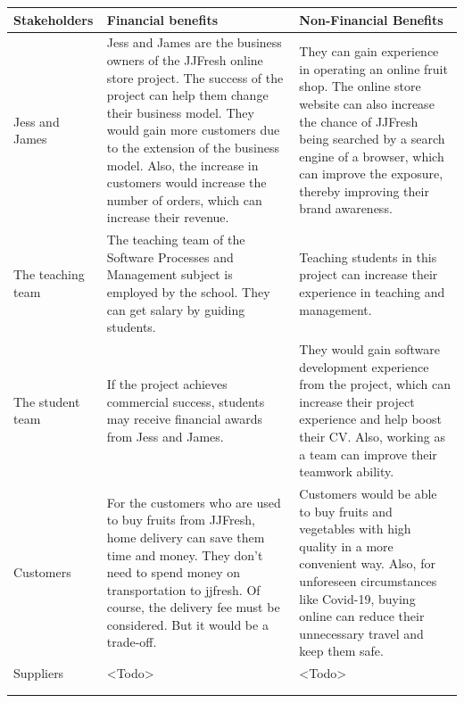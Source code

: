 \documentclass{report}
\begin{document}
\begin{tabularx}{0.95\linewidth}{%
  >{\raggedright\arraybackslash}l%
  >{\raggedright\arraybackslash}X%
  >{\raggedright\arraybackslash}X}
  \toprule
  Stakeholders & Financial benefits & Non-Financial Benefits \\
  \midrule
  Jess and James
  & Jess and James are the business owners of the JJFresh online store project. The success of the project can help them change their business model. They would gain more customers due to the extension of the business model. Also, the increase in customers would increase the number of orders, which can increase their revenue.
  & They can gain experience in operating an online fruit shop. The online store website can also increase the chance of JJFresh being searched by a search engine of a browser, which can improve the exposure, thereby improving their brand awareness. 
  \\
  \midrule
  The teaching team
  & The teaching team of the Software Processes and Management subject is employed by the school. They can get salary by guiding students.
  & Teaching students in this project can increase their experience in teaching and management.
  \\
  \midrule
  The student team
  & If the project achieves commercial success, students may receive financial awards from Jess and James.
  & They would gain software development experience from the project, which can increase their project experience and help boost their CV. Also, working as a team can improve their teamwork ability.
  \\
  \midrule
  Customers
  & For the customers who are used to buy fruits from JJFresh, home delivery can save them time and money. They don't need to spend money on transportation to jjfresh. Of course, the delivery fee must be considered. But it would be a trade-off.
  & Customers would be able to buy fruits and vegetables with high quality in a more convenient way. Also, for unforeseen circumstances like Covid-19, buying online can reduce their unnecessary travel and keep them safe.
  \\
  \midrule
  Suppliers
  & <Todo>
  & <Todo>
  \\
  \bottomrule
  \\
  \caption{Business Value}  
  \label{tab:businessValue}
\end{tabularx}
\end{document}
